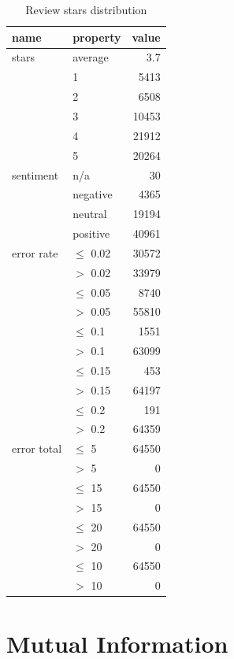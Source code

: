 \begin{table}[h!]
\centering
\begin{tabular}{llr}
\toprule
\textbf{name} & \textbf{property} & \textbf{value} \\
\midrule
stars 	& average	& 3.7 \\
		&1			& 5413 \\
		& 2			& 6508 \\
		& 3			& 10453 \\
		& 4			& 21912 \\
		& 5			& 20264 \\
\midrule
sentiment & n/a & 30 \\
&   negative & 4365 \\
&   neutral & 19194 \\
&   positive & 40961 \\
\midrule
error rate & $\le$ 0.02 & 30572 \\
		   & $>$ 0.02 & 33979 \\
\midrule
		   & $\le$ 0.05 & 8740 \\
		   & $>$ 0.05  & 55810 \\
\midrule
		   & $\le$ 0.1 & 1551 \\
		   & $>$ 0.1  & 63099 \\
\midrule
		   & $\le$ 0.15 & 453 \\
		   & $>$ 0.15  & 64197 \\
\midrule
		   & $\le$ 0.2 & 191 \\
		   & $>$ 0.2  & 64359 \\
\midrule
error total & $\le$ 5  & 64550 \\
			& $>$ 5 & 0 \\
\midrule
			& $\le$ 15  & 64550 \\ 
			& $>$ 15 & 0 \\
\midrule
			& $\le$ 20  & 64550 \\
			& $>$ 20 & 0 \\
\midrule
			& $\le$ 10  & 64550 \\
			& $>$ 10  & 0 \\
\bottomrule
\end{tabular}


\caption{Review stars distribution}\label{tab:star_distr}

\end{table}




\section{Mutual Information}\label{sec:mi}

